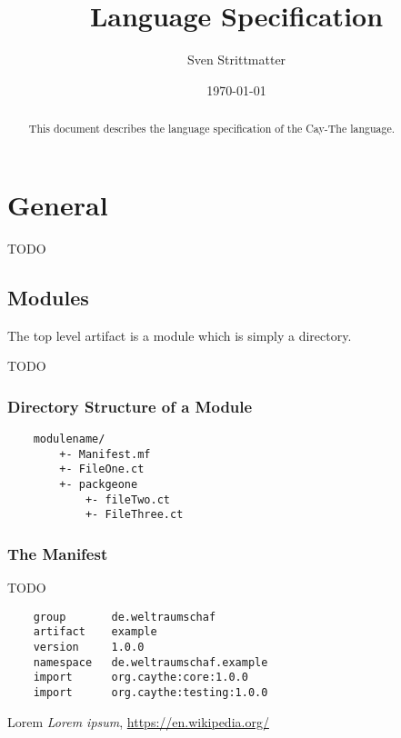 \documentclass[a4paper,12pt]{article}
\title{Language Specification}
\author{Sven Strittmatter}
\date{\today}
\begin{document}
\maketitle
\begin{abstract}
    This document describes the language specification of the Cay-The language.
\end{abstract}
\clearpage

\tableofcontents
\clearpage

\section{General}

TODO

\subsection{Modules}

The top level artifact is a module which is simply a directory.

TODO 

\subsubsection{Directory Structure of a Module}

\begin{verbatim}
    modulename/
        +- Manifest.mf
        +- FileOne.ct
        +- packgeone
            +- fileTwo.ct
            +- FileThree.ct
\end{verbatim}

\subsubsection{The Manifest}

TODO 

\begin{verbatim}
    group       de.weltraumschaf
    artifact    example
    version     1.0.0
    namespace   de.weltraumschaf.example
    import      org.caythe:core:1.0.0
    import      org.caythe:testing:1.0.0
\end{verbatim}
\clearpage


\begin{thebibliography}{56}
    
    Lorem
    \textit{Lorem ipsum},
    \url{https://en.wikipedia.org/}
        
\end{thebibliography}
\end{document}
